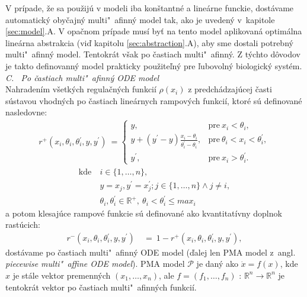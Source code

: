 \documentclass[11pt,final,oneside]{fithesis}
\begin{document}
V pr\'ipade, \v ze sa pou\v zij\'u v modeli iba kon\v stantn\'e a line\'arne funckie, dost\'avame automatick\'y oby\v cajn\'y multi"~afinn\'y model tak, ako
je uveden\'y v~kapitole \ref{sec:model}.A. V opa\v cnom pr\'ipade mus\'i by\v t na tento model aplikovan\'a optim\'alna line\'arna abstrakcia (vi\v d 
kapitolu \ref{sec:abstraction}.A), aby sme 
dostali potrebn\'y multi"~afinn\'y model. Tentokr\'at v\v sak po \v castiach multi"~afinn\'y. Z t\'ych\-to d\^ ovodov je takto definovann\'y model prakticky 
pou\v zite\v ln\'y pre \v lubovoln\'y biologick\'y syst\'em.
\cite{HIBI-2009}\cite{HIBI-2010}
\\

\noindent
\textit{C. \ Po \v castiach multi"~afinn\'y ODE model}
\\

Nahraden\'im v\v setk\'ych regula\v cn\'ych funkci\'i $\rho(x_i)$ z predch\'adzaj\'ucej \v casti s\'ustavou vhodn\'ych po \v castiach line\'arnych 
rampov\'ych funkci\'i, ktor\'e s\'u definovan\'e 
nasledovne:
\begin{align*}
	r^+ (x_i,\theta{}_i,\theta{}_i^{'},y,y^{'}) \ = \left\{ \begin{array}{cl}
y, & \textrm{pre} \ x_i < \theta_i,\\
y + (y^{'} - y)\frac{x_i - \theta_i}{\theta_i^{'} - \theta_i}, & \textrm{pre} \ \theta_i < x_i < \theta_i^{'},\\
y^{'}, & \textrm{pre} \ x_i > \theta_i^{'}.
	\end{array}
	\right.
\end{align*}
\begin{align*}
	\textrm{kde} \ &i \in \{1,\dots{},n\},\\
	&y = x_j, y^{'} = x_j^{'}; j \in \{1,\dots{},n\} \wedge j \neq i,\\
	&\theta_i, \theta_i^{'} \in \mathbb{R}^+, \ \theta_i < \theta_i^{'} \leq max_i
\end{align*}
a potom klesaj\'uce rampov\'e funkcie s\'u definovan\'e ako kvantitat\'ivny doplnok rast\'ucich:
\begin{align*}
r^- (x_i,\theta{}_i,\theta{}_i^{'},y,y^{'}) &\ = \ 1 - r^+ (x_i,\theta{}_i,\theta{}_i^{'},y,y^{'}),
\end{align*}
dost\'avame po \v castiach multi"~a\-fin\-n\'y ODE model 
(\v dalej len PMA model z~angl. \textit{piecewise multi"~affine ODE model}). PMA model $\mathcal{P}$ je dan\'y ako $\dot{x} = f(x)$, 
kde $x$ je st\'ale vektor premenn\'ych $(x_1,\dots{},x_n)$, ale $f = (f_1,\dots{},f_n)$ : $\mathbb{R}^n \rightarrow \mathbb{R}^n$ je tentokr\'at vektor 
po \v castiach multi"~afinn\'ych funkci\'i. 
\end{document}
